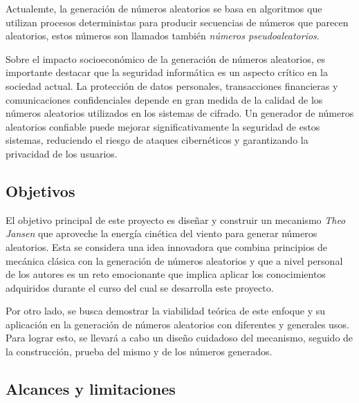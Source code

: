 Actualemte, la generación de números aleatorios se basa en algoritmos que utilizan procesos deterministas para producir secuencias de números que parecen aleatorios, estos números son llamados también \textit{números pseudoaleatorios}.

Sobre el impacto socioeconómico de la generación de números aleatorios, es importante destacar que la seguridad informática es un aspecto crítico en la sociedad actual. La protección de datos personales, transacciones financieras y comunicaciones confidenciales depende en gran medida de la calidad de los números aleatorios utilizados en los sistemas de cifrado. Un generador de números aleatorios confiable puede mejorar significativamente la seguridad de estos sistemas, reduciendo el riesgo de ataques cibernéticos y garantizando la privacidad de los usuarios.

\subsection{Objetivos}

El objetivo principal de este proyecto es diseñar y construir un mecanismo \textit{Theo Jansen} que aproveche la energía cinética del viento para generar números aleatorios. Esta se considera una idea innovadora que combina principios de mecánica clásica con la generación de números aleatorios y que a nivel personal de los autores es un reto emocionante que implica aplicar los conocimientos adquiridos durante el curso del cual se desarrolla este proyecto.

Por otro lado, se busca demostrar la viabilidad teórica de este enfoque y su aplicación en la generación de números aleatorios con diferentes y generales usos. Para lograr esto, se llevará a cabo un diseño cuidadoso del mecanismo, seguido de la construcción, prueba del mismo y de los números generados. 

\subsection{Alcances y limitaciones}

